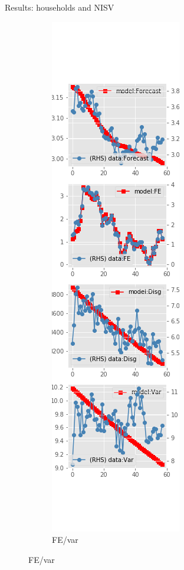 \documentclass{beamer}
\begin{document}
\begin{frame}{Results: households and NISV}
\begin{figure}[ht]
\begin{subfigure}[b]{0.19\textwidth}
		\end{subfigure}
		\hfill
		\begin{subfigure}[b]{0.19\textwidth}
			\caption{FE/var}
			\includegraphics[width=\textwidth, height = 0.8\textheight]{figuresDraft/sce_ni_est_sv_diag3.png}

\end{subfigure}
\end{figure}
\end{frame}
\end{document}
